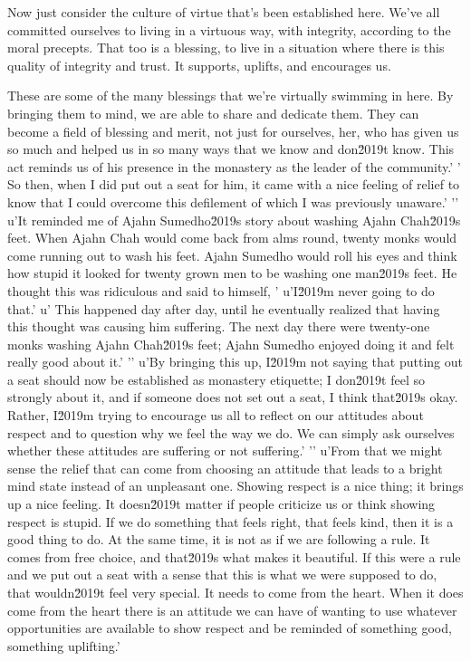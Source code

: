 Now just consider the culture of virtue that's been established here. 
We've all committed ourselves to living in a virtuous way, with 
integrity, according to the moral precepts. That too is a blessing, to 
live in a situation where there is this quality of integrity and trust. 
It supports, uplifts, and encourages us.

These are some of the many blessings that we're virtually swimming in 
here. By bringing them to mind, we are able to share and dedicate them. 
They can become a field of blessing and merit, not just for ourselves, 
her, who has given us so much and helped us in so many ways that we know and don\u2019t know. This act reminds us of his presence in the monastery as the leader of the community.'
' So then, when I did put out a seat for him, it came with a nice feeling of relief to know that I could overcome this defilement of which I was previously unaware.'
'\n'
u'It reminded me of Ajahn Sumedho\u2019s story about washing Ajahn Chah\u2019s feet. When Ajahn Chah would come back from alms round, twenty monks would come running out to wash his feet. Ajahn Sumedho would roll his eyes and think how stupid it looked for twenty grown men to be washing one man\u2019s feet. He thought this was ridiculous and said to himself, '
u'I\u2019m never going to do that.'
u' This happened day after day, until he eventually realized that having this thought was causing him suffering. The next day there were twenty-one monks washing Ajahn Chah\u2019s feet; Ajahn Sumedho enjoyed doing it and felt really good about it.'
'\n'
u'By bringing this up, I\u2019m not saying that putting out a seat should now be established as monastery etiquette; I don\u2019t feel so strongly about it, and if someone does not set out a seat, I think that\u2019s okay. Rather, I\u2019m trying to encourage us all to reflect on our attitudes about respect and to question why we feel the way we do. We can simply ask ourselves whether these attitudes are suffering or not suffering.'
'\n'
u'From that we might sense the relief that can come from choosing an attitude that leads to a bright mind state instead of an unpleasant one. Showing respect is a nice thing; it brings up a nice feeling. It doesn\u2019t matter if people criticize us or think showing respect is stupid. If we do something that feels right, that feels kind, then it is a good thing to do. At the same time, it is not as if we are following a rule. It comes from free choice, and that\u2019s what makes it beautiful. If this were a rule and we put out a seat with a sense that this is what we were supposed to do, that wouldn\u2019t feel very special. It needs to come from the heart. When it does come from the heart there is an attitude we can have of wanting to use whatever opportunities are available to show respect and be reminded of something good, something uplifting.'
